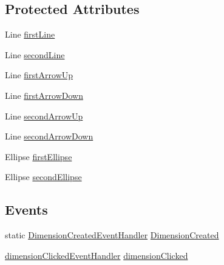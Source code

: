 \subsection*{Protected Attributes}
\begin{DoxyCompactItemize}
\item 
Line \mbox{\hyperlink{class_dimension___chain_1_1_u_i___dimension_a6aabc33312f678ca31ba5225ebec74f2}{first\+Line}}
\item 
Line \mbox{\hyperlink{class_dimension___chain_1_1_u_i___dimension_a28a3df61be944ed3928f280e5f8569f8}{second\+Line}}
\item 
Line \mbox{\hyperlink{class_dimension___chain_1_1_u_i___dimension_a9d9192fc0023059f5852d31dcd617438}{first\+Arrow\+Up}}
\item 
Line \mbox{\hyperlink{class_dimension___chain_1_1_u_i___dimension_a067d65ad1daf0d0d4fea4bc222dc7ca8}{first\+Arrow\+Down}}
\item 
Line \mbox{\hyperlink{class_dimension___chain_1_1_u_i___dimension_abb513cf05f3e2c8f94360f4593d1e33d}{second\+Arrow\+Up}}
\item 
Line \mbox{\hyperlink{class_dimension___chain_1_1_u_i___dimension_a62b255881d7546bf0bd5ab04448277b8}{second\+Arrow\+Down}}
\item 
Ellipse \mbox{\hyperlink{class_dimension___chain_1_1_u_i___dimension_ac871d3b75626afcde3b3e45664a5b491}{first\+Ellipse}}
\item 
Ellipse \mbox{\hyperlink{class_dimension___chain_1_1_u_i___dimension_a7383ff515a7b37e9579c6d66d36cba10}{second\+Ellipse}}
\end{DoxyCompactItemize}
\subsection*{Events}
\begin{DoxyCompactItemize}
\item 
static \mbox{\hyperlink{class_dimension___chain_1_1_u_i___dimension_a106096e0c35875f5fab0e7f22e0b5941}{Dimension\+Created\+Event\+Handler}} \mbox{\hyperlink{class_dimension___chain_1_1_u_i___dimension_ad20f8fb74391f34b390ed237e6bf054e}{Dimension\+Created}}
\item 
\mbox{\hyperlink{class_dimension___chain_1_1_u_i___dimension_a45fef985621de3e250d8343eeeca3aed}{dimension\+Clicked\+Event\+Handler}} \mbox{\hyperlink{class_dimension___chain_1_1_u_i___dimension_aaf2a49daf74338ba9eec24e2ce40e539}{dimension\+Clicked}}
\end{DoxyCompactItemize}


